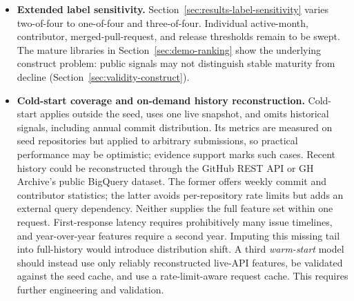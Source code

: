 \begin{itemize}
    \item \textbf{Extended label sensitivity.} Section~\ref{sec:results-label-sensitivity} varies two-of-four to one-of-four and three-of-four. Individual active-month, contributor, merged-pull-request, and release thresholds remain to be swept. The mature libraries in Section~\ref{sec:demo-ranking} show the underlying construct problem: public signals may not distinguish stable maturity from decline (Section~\ref{sec:validity-construct}).
    \item \textbf{Cold-start coverage and on-demand history reconstruction.} Cold-start applies outside the seed, uses one live snapshot, and omits historical signals, including annual commit distribution. Its metrics are measured on seed repositories but applied to arbitrary submissions, so practical performance may be optimistic; evidence support marks such cases. Recent history could be reconstructed through the GitHub REST API or GH Archive's public BigQuery dataset. The former offers weekly commit and contributor statistics; the latter avoids per-repository rate limits but adds an external query dependency. Neither supplies the full feature set within one request. First-response latency requires prohibitively many issue timelines, and year-over-year features require a second year. Imputing this missing tail into full-history would introduce distribution shift. A third \emph{warm-start} model should instead use only reliably reconstructed live-API features, be validated against the seed cache, and use a rate-limit-aware request cache. This requires further engineering and validation.
\end{itemize}
